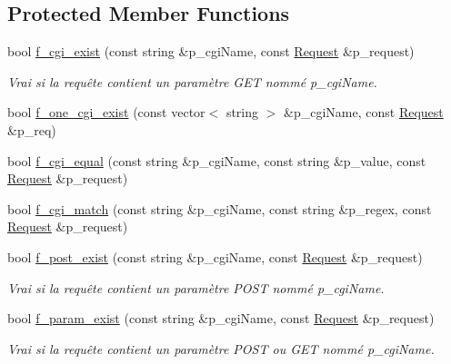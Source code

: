 \subsection*{Protected Member Functions}
\begin{DoxyCompactItemize}
\item 
bool \hyperlink{classxtd_1_1network_1_1http_1_1Server_a415d74507fdd7b587653c7b348070f09}{f\-\_\-cgi\-\_\-exist} (const string \&p\-\_\-cgi\-Name, const \hyperlink{classxtd_1_1network_1_1http_1_1Request}{Request} \&p\-\_\-request)
\begin{DoxyCompactList}\small\item\em Vrai si la requête contient un paramètre G\-E\-T nommé p\-\_\-cgi\-Name. \end{DoxyCompactList}\item 
bool \hyperlink{classxtd_1_1network_1_1http_1_1Server_a0d97dc94a40126765adcbd3330d2e5a2}{f\-\_\-one\-\_\-cgi\-\_\-exist} (const vector$<$ string $>$ \&p\-\_\-cgi\-Name, const \hyperlink{classxtd_1_1network_1_1http_1_1Request}{Request} \&p\-\_\-req)
\item 
bool \hyperlink{classxtd_1_1network_1_1http_1_1Server_a66ddce9c1059014c26110cfc06541baf}{f\-\_\-cgi\-\_\-equal} (const string \&p\-\_\-cgi\-Name, const string \&p\-\_\-value, const \hyperlink{classxtd_1_1network_1_1http_1_1Request}{Request} \&p\-\_\-request)
\item 
bool \hyperlink{classxtd_1_1network_1_1http_1_1Server_a0218f1e1bed9e1ae09b6a772a38645ef}{f\-\_\-cgi\-\_\-match} (const string \&p\-\_\-cgi\-Name, const string \&p\-\_\-regex, const \hyperlink{classxtd_1_1network_1_1http_1_1Request}{Request} \&p\-\_\-request)
\item 
bool \hyperlink{classxtd_1_1network_1_1http_1_1Server_aa6ea204c5132836f0c4112aaa331b3a1}{f\-\_\-post\-\_\-exist} (const string \&p\-\_\-cgi\-Name, const \hyperlink{classxtd_1_1network_1_1http_1_1Request}{Request} \&p\-\_\-request)
\begin{DoxyCompactList}\small\item\em Vrai si la requête contient un paramètre P\-O\-S\-T nommé p\-\_\-cgi\-Name. \end{DoxyCompactList}\item 
bool \hyperlink{classxtd_1_1network_1_1http_1_1Server_a3563c3986e43c84e4130af46dd16103c}{f\-\_\-param\-\_\-exist} (const string \&p\-\_\-cgi\-Name, const \hyperlink{classxtd_1_1network_1_1http_1_1Request}{Request} \&p\-\_\-request)
\begin{DoxyCompactList}\small\item\em Vrai si la requête contient un paramètre P\-O\-S\-T ou G\-E\-T nommé p\-\_\-cgi\-Name. \end{DoxyCompactList}\item 

\end{DoxyCompactItemize}
